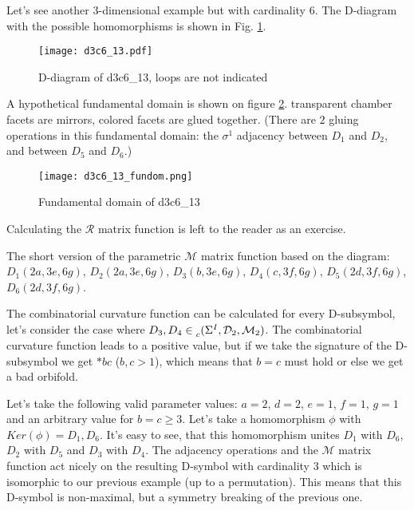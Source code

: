 \documentclass[12pt,a4paper]{article}
\newcommand{\leftsub}[2]{{\vphantom{#2}}_{#1}{#2}}
\theoremstyle{plain}%
\theoremstyle{definition}
\theoremstyle{remark}
\begin{document}






Let's see another $3$-dimensional example but with cardinality $6$. The
D-diagram with the possible homomorphisms is shown in Fig.
\ref{fig:d3c6_13}.

\begin{figure}
  \caption{\label{fig:d3c6_13} D-diagram of d3c6\_13, loops are not indicated}
  \center
  \texttt{[image: d3c6\_13.pdf]}
\end{figure}

A hypothetical fundamental domain is shown on figure \ref{fig:d3c6_13_fundom}.
transparent chamber facets are mirrors, colored facets are glued together.
(There are $2$ gluing operations in this fundamental domain: the $\sigma^1$ adjacency between
$D_1$ and $D_2$, and between $D_5$ and $D_6$.)

\begin{figure}
  \caption{\label{fig:d3c6_13_fundom} Fundamental domain of d3c6\_13}
  \center
  \texttt{[image: d3c6\_13\_fundom.png]}
\end{figure}

Calculating the $\mathcal{R}$ matrix function is left to the reader as an
exercise.

The short version of the parametric $\mathcal{M}$ matrix function based on the
diagram: $D_1(2a, 3e, 6g)$, $D_2(2a, 3e, 6g)$, $D_3(b, 3e, 6g)$, $D_4(c, 3f,
6g)$, $D_5(2d, 3f, 6g)$, $D_6(2d, 3f, 6g)$.

The combinatorial curvature function can be calculated for every D-subsymbol,
let's consider the case where
$D_3,D_4\in\leftsub{c}{(\Sigma^I,\mathcal{D}_2,\mathcal{M}_2)}$. The combinatorial
curvature function leads to a positive value, but if we take the signature of
the D-subsymbol we get $*bc$ ($b,c>1$), which means that $b=c$ must hold or else
we get a bad orbifold.

Let's take the following valid parameter values: $a=2$, $d=2$, $e=1$, $f=1$, $g=1$ and
an arbitrary value for $b=c\geq3$. Let's take a homomorphism $\phi$ with
$Ker(\phi)={D_1,D_6}$. It's easy to see, that this homomorphism unites $D_1$
with $D_6$, $D_2$ with $D_5$ and $D_3$ with $D_4$. The adjacency operations and
the $\mathcal{M}$ matrix function act nicely on the resulting D-symbol
with cardinality $3$ which is isomorphic to our previous example (up to a
permutation). This means that this D-symbol is non-maximal, but a symmetry
breaking of the previous one. 
\end{document}
